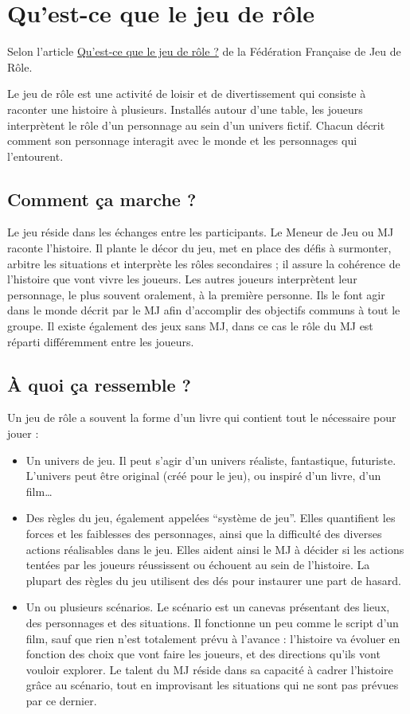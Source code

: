 \documentclass[twoside,12pt,english]{book}
\begin{document}
\section{Qu'est-ce que le jeu de rôle}

Selon l'article \href{http://www.ffjdr.org/quest-ce-que-le-jeu-de-role/}{Qu’est-ce que le jeu de rôle ?} de la Fédération Française de Jeu de Rôle.

Le jeu de rôle est une activité de loisir et de divertissement qui consiste à raconter une histoire à plusieurs. Installés autour d’une table, les joueurs interprètent le rôle d’un personnage au sein d’un univers fictif. Chacun décrit comment son personnage interagit avec le monde et les personnages qui l’entourent.

\subsection*{Comment ça marche ?}

Le jeu réside dans les échanges entre les participants. Le Meneur de Jeu ou MJ raconte l’histoire. Il plante le décor du jeu, met en place des défis à surmonter, arbitre les situations et interprète les rôles secondaires ; il assure la cohérence de l’histoire que vont vivre les joueurs. Les autres joueurs interprètent leur personnage, le plus souvent oralement, à la première personne. Ils le font agir dans le monde décrit par le MJ afin d’accomplir des objectifs communs à tout le groupe. Il existe également des jeux sans MJ, dans ce cas le rôle du MJ est réparti différemment entre les joueurs.

\subsection*{À quoi ça ressemble ?}

Un jeu de rôle a souvent la forme d’un livre qui contient tout le nécessaire pour jouer :

\begin{itemize}
\item Un univers de jeu. Il peut s’agir d’un univers réaliste, fantastique, futuriste. L’univers peut être original (créé pour le jeu), ou inspiré d’un livre, d’un film…
\item Des règles du jeu, également appelées “système de jeu”. Elles quantifient les forces et les faiblesses des personnages, ainsi que la difficulté des diverses actions réalisables dans le jeu. Elles aident ainsi le MJ à décider si les actions tentées par les joueurs réussissent ou échouent au sein de l’histoire. La plupart des règles du jeu utilisent des dés pour instaurer une part de hasard.
\item Un ou plusieurs scénarios. Le scénario est un canevas présentant des lieux, des personnages et des situations. Il fonctionne un peu comme le script d’un film, sauf que rien n’est totalement prévu à l’avance : l’histoire va évoluer en fonction des choix que vont faire les joueurs, et des directions qu’ils vont vouloir explorer. Le talent du MJ réside dans sa capacité à cadrer l’histoire grâce au scénario, tout en improvisant les situations qui ne sont pas prévues par ce dernier.
\end{itemize}
\end{document}

